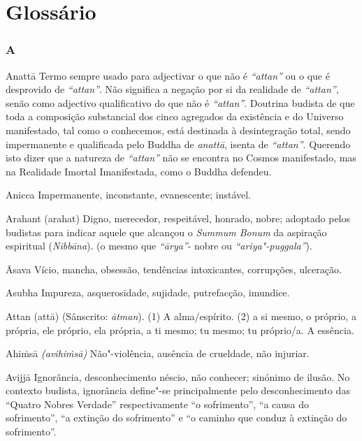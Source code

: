 \chapter{Glossário}

\subsection{A}

\begin{glossarydescription}

\item[Anattā] Termo sempre usado para adjectivar o que não é
\emph{“attan”} ou o que é desprovido de \emph{“attan”}. Não significa a
negação por si da realidade de \emph{“attan”}, senão como adjectivo qualificativo
do que não é \emph{“attan”}. Doutrina budista de que toda a composição substancial
dos cinco agregados da existência e do Universo manifestado, tal como o
conhecemos, está destinada à desintegração total, sendo impermanente e qualificada
pelo Buddha de \emph{anattā}, isenta de \emph{“attan”}. Querendo isto dizer que a
natureza de \emph{“attan”} não se encontra no Cosmos manifestado, mas na Realidade
Imortal Imanifestada, como o Buddha defendeu.

\item[Anicca] Impermanente, inconstante, evanescente; instável.

\item[Arahant (arahat)] Digno, merecedor, respeitável, honrado, nobre; adoptado
pelos budistas para indicar aquele que alcançou o \emph{Summum Bonum} da
aspiração espiritual (\emph{Nibbāna}). (o mesmo que \emph{“ārya”}- nobre ou
\emph{“ariya"-puggala”}).

\item[Āsava] Vício, mancha, obsessão, tendências intoxicantes, corrupções,
ulceração.

\item[Asubha] Impureza, asquerosidade, sujidade, putrefacção, imundice.

\item[Attan (attā)] (Sânscrito: \emph{ātman}). (1) A alma/espírito. (2) a si
mesmo, o próprio, a própria, ele próprio, ela própria, a ti mesmo; tu mesmo; tu
próprio/a. A essência.

\item[Ahiṁsā] \emph{(avihiṁsā)} Não"-violência, ausência de crueldade, não
injuriar.

\item[Avijjā] Ignorância, desconhecimento néscio, não conhecer; sinónimo de
ilusão. No contexto budista, ignorância define"-se principalmente pelo
desconhecimento das “Quatro Nobres Verdade” respectivamente “o sofrimento”,
“a causa do sofrimento”, “a extinção do sofrimento” e “o caminho que conduz
à extinção do sofrimento”.

\end{glossarydescription}

